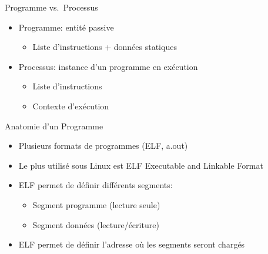 \documentclass[11pt]{beamer}
\author{Pablo Oliveira [pablo.oliveira@uvsq.fr]}
\begin{document}
\maketitle


\begin{frame}{Programme vs.~Processus}
\begin{itemize}
\item
  Programme: entité passive

  \begin{itemize}
  \item
    Liste d'instructions + données statiques
  \end{itemize}
\item
  Processus: instance d'un programme en exécution

  \begin{itemize}
  \item
    Liste d'instructions
  \item
    Contexte d'exécution
  \end{itemize}
\end{itemize}

\end{frame}

\begin{frame}{Anatomie d'un Programme}

\begin{itemize}
\item
  Plusieurs formats de programmes (ELF, a.out)
\item
  Le plus utilisé sous Linux est ELF Executable and Linkable Format
\item
  ELF permet de définir différents segments:

  \begin{itemize}
  \item
    Segment programme (lecture seule)
  \item
    Segment données (lecture/écriture)
  \end{itemize}
\item
  ELF permet de définir l'adresse où les segments seront chargés
\end{itemize}

\end{frame}
\end{document}

